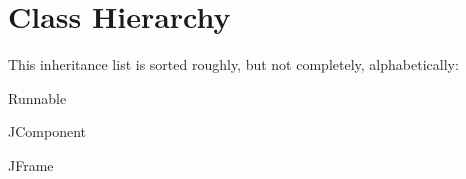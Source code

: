 \section{Class Hierarchy}
This inheritance list is sorted roughly, but not completely, alphabetically\+:\begin{DoxyCompactList}
\item {}
\item Runnable\begin{DoxyCompactList}
\item {}
\end{DoxyCompactList}
\item J\+Component\begin{DoxyCompactList}
\item {}
\end{DoxyCompactList}
\item J\+Frame\begin{DoxyCompactList}
\item {}
\end{DoxyCompactList}
\end{DoxyCompactList}
